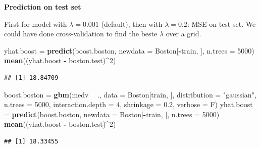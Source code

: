 \documentclass[10pt,ignorenonframetext,]{beamer}
\newenvironment{Shaded}{\begin{snugshade}}{\end{snugshade}}
\newcommand{\KeywordTok}[1]{\textcolor[rgb]{0.13,0.29,0.53}{\textbf{#1}}}
\newcommand{\DataTypeTok}[1]{\textcolor[rgb]{0.13,0.29,0.53}{#1}}
\newcommand{\DecValTok}[1]{\textcolor[rgb]{0.00,0.00,0.81}{#1}}
\newcommand{\FloatTok}[1]{\textcolor[rgb]{0.00,0.00,0.81}{#1}}
\newcommand{\StringTok}[1]{\textcolor[rgb]{0.31,0.60,0.02}{#1}}
\newcommand{\OperatorTok}[1]{\textcolor[rgb]{0.81,0.36,0.00}{\textbf{#1}}}
\newcommand{\NormalTok}[1]{#1}
\begin{document}
\begin{frame}[fragile]

\textbf{Prediction on test set}

First for model with \(\lambda=0.001\) (default), then with
\(\lambda=0.2\): MSE on test set. We could have done cross-validation to
find the beste \(\lambda\) over a grid.

\begin{Shaded}
\begin{Highlighting}[]
\NormalTok{yhat.boost =}\StringTok{ }\KeywordTok{predict}\NormalTok{(boost.boston, }\DataTypeTok{newdata =}\NormalTok{ Boston[}\OperatorTok{-}\NormalTok{train, ], }\DataTypeTok{n.trees =} \DecValTok{5000}\NormalTok{)}
\KeywordTok{mean}\NormalTok{((yhat.boost }\OperatorTok{-}\StringTok{ }\NormalTok{boston.test)}\OperatorTok{^}\DecValTok{2}\NormalTok{)}
\end{Highlighting}
\end{Shaded}

\begin{verbatim}
## [1] 18.84709
\end{verbatim}

\begin{Shaded}
\begin{Highlighting}[]
\NormalTok{boost.boston =}\StringTok{ }\KeywordTok{gbm}\NormalTok{(medv }\OperatorTok{~}\StringTok{ }\NormalTok{., }\DataTypeTok{data =}\NormalTok{ Boston[train, ], }\DataTypeTok{distribution =} \StringTok{"gaussian"}\NormalTok{, }
    \DataTypeTok{n.trees =} \DecValTok{5000}\NormalTok{, }\DataTypeTok{interaction.depth =} \DecValTok{4}\NormalTok{, }\DataTypeTok{shrinkage =} \FloatTok{0.2}\NormalTok{, }\DataTypeTok{verbose =}\NormalTok{ F)}
\NormalTok{yhat.boost =}\StringTok{ }\KeywordTok{predict}\NormalTok{(boost.boston, }\DataTypeTok{newdata =}\NormalTok{ Boston[}\OperatorTok{-}\NormalTok{train, ], }\DataTypeTok{n.trees =} \DecValTok{5000}\NormalTok{)}
\KeywordTok{mean}\NormalTok{((yhat.boost }\OperatorTok{-}\StringTok{ }\NormalTok{boston.test)}\OperatorTok{^}\DecValTok{2}\NormalTok{)}
\end{Highlighting}
\end{Shaded}

\begin{verbatim}
## [1] 18.33455
\end{verbatim}

\end{frame}
\end{document}
